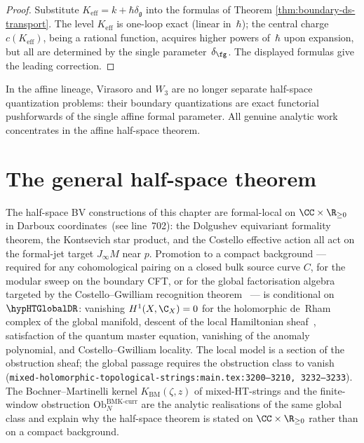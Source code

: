 \begin{proof}
Substitute $K_{\mathrm{eff}}=k+\hbar\delta_{\mathfrak g}$ into the formulas of
Theorem \ref{thm:boundary-ds-transport}. The level $K_{\mathrm{eff}}$ is one-loop exact (linear in~$\hbar$);
the central charge $c(K_{\mathrm{eff}})$, being a rational function,
acquires higher powers of~$\hbar$ upon expansion, but all are determined by the single parameter~$\delta_{\fg}$.
The displayed formulas give the leading correction.
\end{proof}

\begin{remark}
In the affine lineage, Virasoro and $W_3$ are no longer separate half-space
quantization problems: their boundary quantizations are exact functorial pushforwards of the
single affine formal parameter. All genuine analytic work concentrates in the affine half-space theorem.
\end{remark}

\section{The general half-space theorem}

\begin{remark}
\label{rem:ht-global-de-rham-affine-half-space}
The half-space BV constructions of this chapter are formal-local on
$\CC\times\R_{\ge 0}$ in Darboux coordinates~(see line~702): the
Dolgushev equivariant formality theorem, the Kontsevich star product,
and the Costello effective action all act on the formal-jet target
$J_\infty M$ near $p$. Promotion to a compact background — required
for any cohomological pairing on a closed bulk source curve $C$, for
the modular sweep on the boundary CFT, or for the global
factorisation algebra targeted by the Costello--Gwilliam recognition
theorem~\cite{CG17} — is conditional on $\hypHTGlobalDR$: vanishing
$H^1(X,\C_X) = 0$ for the holomorphic de~Rham complex of the global
manifold, descent of the local Hamiltonian sheaf~\cite[\S4--5]{CG17},
satisfaction of the quantum master equation, vanishing of the
anomaly polynomial, and Costello--Gwilliam locality. The local model
is a section of the obstruction sheaf; the global passage requires
the obstruction class to vanish
(\texttt{mixed-holomorphic-topological-strings:main.tex:3200--3210,
3232--3233}). The Bochner--Martinelli kernel $K_{\mathrm{BM}}(\zeta,z)$
of mixed-HT-strings and the finite-window obstruction
$\mathrm{Ob}^{\mathrm{BMK\mbox{-}curr}}_N$ are the analytic
realisations of the same global class and explain why the
half-space theorem is stated on $\CC\times\R_{\ge 0}$ rather than
on a compact background.
\end{remark}

